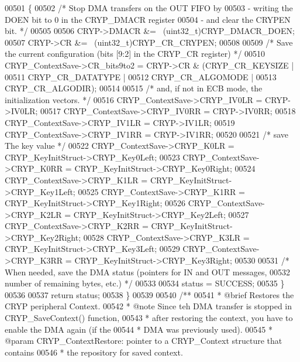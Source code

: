 \begin{DoxyCode}
00501   \{
00502     \textcolor{comment}{/* Stop DMA transfers on the OUT FIFO by }
00503 \textcolor{comment}{       - writing the DOEN bit to 0 in the CRYP\_DMACR register }
00504 \textcolor{comment}{       - and clear the CRYPEN bit. */}
00505 
00506     CRYP->DMACR &= ~(uint32\_t)CRYP_DMACR_DOEN;
00507     CRYP->CR &= ~(uint32\_t)CRYP_CR_CRYPEN;
00508 
00509     \textcolor{comment}{/* Save the current configuration (bits [9:2] in the CRYP\_CR register) */}
00510     CRYP\_ContextSave->CR\_bits9to2  = CRYP->CR & (CRYP_CR_KEYSIZE  |
00511                                                  CRYP_CR_DATATYPE |
00512                                                  CRYP_CR_ALGOMODE |
00513                                                  CRYP_CR_ALGODIR);
00514 
00515     \textcolor{comment}{/* and, if not in ECB mode, the initialization vectors. */}
00516     CRYP\_ContextSave->CRYP\_IV0LR = CRYP->IV0LR;
00517     CRYP\_ContextSave->CRYP\_IV0RR = CRYP->IV0RR;
00518     CRYP\_ContextSave->CRYP\_IV1LR = CRYP->IV1LR;
00519     CRYP\_ContextSave->CRYP\_IV1RR = CRYP->IV1RR;
00520 
00521     \textcolor{comment}{/* save The key value */}
00522     CRYP\_ContextSave->CRYP\_K0LR = CRYP\_KeyInitStruct->CRYP\_Key0Left;
00523     CRYP\_ContextSave->CRYP\_K0RR = CRYP\_KeyInitStruct->CRYP\_Key0Right;
00524     CRYP\_ContextSave->CRYP\_K1LR = CRYP\_KeyInitStruct->CRYP\_Key1Left;
00525     CRYP\_ContextSave->CRYP\_K1RR = CRYP\_KeyInitStruct->CRYP\_Key1Right;
00526     CRYP\_ContextSave->CRYP\_K2LR = CRYP\_KeyInitStruct->CRYP\_Key2Left;
00527     CRYP\_ContextSave->CRYP\_K2RR = CRYP\_KeyInitStruct->CRYP\_Key2Right;
00528     CRYP\_ContextSave->CRYP\_K3LR = CRYP\_KeyInitStruct->CRYP\_Key3Left;
00529     CRYP\_ContextSave->CRYP\_K3RR = CRYP\_KeyInitStruct->CRYP\_Key3Right;
00530 
00531    \textcolor{comment}{/* When needed, save the DMA status (pointers for IN and OUT messages, }
00532 \textcolor{comment}{      number of remaining bytes, etc.) */}
00533 
00534     status = SUCCESS;
00535   \}
00536 
00537    \textcolor{keywordflow}{return} status;
00538 \}
00539 
00540 \textcolor{comment}{/**}
00541 \textcolor{comment}{  * @brief  Restores the CRYP peripheral Context.}
00542 \textcolor{comment}{  * @note   Since teh DMA transfer is stopped in CRYP\_SaveContext() function,}
00543 \textcolor{comment}{  *         after restoring the context, you have to enable the DMA again (if the}
00544 \textcolor{comment}{  *         DMA was previously used).  }
00545 \textcolor{comment}{  * @param  CRYP\_ContextRestore: pointer to a CRYP\_Context structure that contains}
00546 \textcolor{comment}{  *         the repository for saved context.}

\end{DoxyCode}
